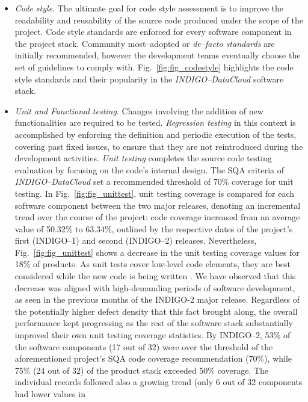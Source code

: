 \documentclass[journal]{IEEEtran}
\begin{document}
\begin{itemize}
\item \textit{Code style}.
The ultimate goal for code style assessment is to improve the readability and reusability of the
source code produced under the scope of the
project. Code style standards are enforced for every software component in the project stack. Community
most--adopted or \textit{de--facto standards} are initially recommended, however the development teams eventually
choose the set of guidelines to comply with. Fig.~\ref{fig:fig_codestyle} highlights the code style standards and
their popularity
in the {\sl INDIGO--DataCloud} software stack.

\item \textit{Unit and Functional testing}.
Changes involving the addition of new functionalities are required to be tested. \textit{Regression
testing} in this context is accomplished by enforcing the definition and periodic execution
of the tests, covering past fixed issues, to ensure that they are not reintroduced during the development
activities. \textit{Unit testing} completes the source code testing evaluation by focusing on the code's
internal design. The SQA criteria of {\sl INDIGO--DataCloud} set a recommended threshold of 70\% coverage
for unit testing. In Fig.~\ref{fig:fig_unittest}, unit testing coverage is compared for each software
component between the two major releases, denoting an incremental trend over the course of the project:
code coverage increased from an average value of 50.32\% to 63.34\%, outlined by the respective dates of
the project's first (INDIGO--1) and second (INDIGO--2) releases. Nevertheless, Fig.~\ref{fig:fig_unittest}
shows a decrease in the unit testing coverage values for 18\% of products. As unit tests cover low-level
code elements, they are best considered while the new code is being written \cite{unit-test-frameworks}.
We have observed that this decrease was aligned with high-demanding periods of software development, as
seen in the previous months of the INDIGO-2 major release. Regardless of the potentially higher defect
density that this fact brought along, the overall performance kept progressing as the rest of the software
stack substantially improved their own unit testing coverage statistics. By INDIGO--2, 53\% of the software
components (17 out of 32) were over the threshold of the aforementioned project's SQA code coverage
recommendation (70\%), while 75\% (24 out of 32) of the product stack exceeded 50\% coverage.
The individual records followed also a growing trend (only 6 out of 32 components had lower values in

\end{itemize}
\end{document}

